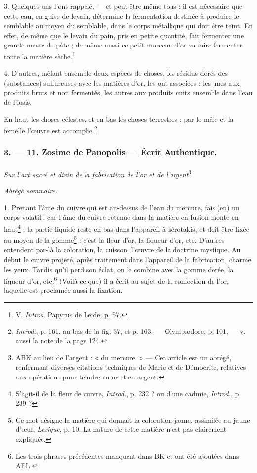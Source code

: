 \documentclass[landscape, a4paper, 11pt, oneside, polutonikogreek, french]{article}
\begin{document}
3. Quelques-uns l'ont rappelé, --- et peut-être même tous : il est nécessaire que cette eau, en guise de levain, détermine la fermentation destinée à produire le semblable au moyen du semblable, dans le corps métallique qui doit être teint. En effet, de même que le levain du pain, pris en petite quantité, fait fermenter une grande masse de pâte ; de même aussi ce petit morceau d'or va faire fermenter toute la matière sèche.\footnote{V. \emph{Introd.} Papyrus de Leide, p. 57.}

4. D'autres, mêlant ensemble deux espèces de choses, les résidus dorés des (substances) sulfureuses avec les matières d'or, les ont associées : les unes aux produits bruts et non fermentés, les autres aux produits cuits ensemble dans l'eau de l'iosis.

\bigskip
\centerline{\EightStarTaper}
\centerline{\EightStarTaper\EightStarTaper}
\bigskip

En haut les choses célestes, et en bas les choses terrestres ; par le mâle et la femelle l'œuvre est accomplie.\footnote{\emph{Introd.}, p. 161, au bas de la fig. 37, et p. 163. --- Olympiodore, p. 101, --- v. aussi la note de la page 124.}

\bigskip
\centerline{\EightStarTaper}
\centerline{\EightStarTaper\EightStarTaper}
\bigskip

\subsubsection{3. --- 11. Zosime de Panopolis --- Écrit Authentique.}
\paragraph{}
\emph{Sur l'art sacré et divin de la fabrication de l'or et de l'argent}\footnote{ABK au lieu de l'argent : « du mercure. » --- Cet article est un abrégé, renfermant diverses citations techniques de Marie et de Démocrite, relatives aux opérations pour teindre en or et en argent.}

\emph{Abrégé sommaire.}

1. Prenant l'âme du cuivre qui est au-dessus de l'eau du mercure, fais (en) un corps volatil ; car l'âme du cuivre retenue dans la matière en fusion monte en haut\footnote{S'agit-il de la fleur de cuivre, \emph{Introd.}, p. 232 ? ou d'une cadmie, \emph{Introd.}, p. 239 ?} ; la partie liquide reste en bas dans l'appareil à kérotakis, et doit être fixée au moyen de la gomme\footnote{Ce mot désigne la matière qui donnait la coloration jaune, assimilée au jaune d'œuf, \emph{Lexique}, p. 10. La nature de cette matière n'est pas clairement expliquée.} : c'est la fleur d'or, la liqueur d'or, etc. D'autres entendent par-là la coloration, la cuisson, l'œuvre de la doctrine mystique. Au début le cuivre projeté, après traitement dans l'appareil de la fabrication, charme les yeux. Tandis qu'il perd son éclat, on le combine avec la gomme dorée, la liqueur d'or, etc.\footnote{Les trois phrases précédentes manquent dans BK et ont été ajoutées dans AEL.} (Voilà ce que) il a écrit au sujet de la confection de l'or, laquelle est proclamée aussi la fixation.
\end{document}
